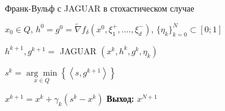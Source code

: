 \documentclass{beamer}
\begin{document}
\begin{frame}{Франк-Вульф с JAGUAR в стохастическом случае}
    
    \begin{algorithm}[H]
        \caption{ФВ с JAGUAR в стохастическом случае}
        \begin{algorithmic}[1]
                 $x_0 \in Q$, $h^0 = g^0 = \widetilde\nabla f_{\delta}(x^0, \xi_1^+, ...., \xi_d^-)$, $\{\eta_k\}_{k=0}^N \subset [0; 1]$
                
                    \State $h^{k+1}, g^{k+1} = $ JAGUAR $\left( x^k, h^k, g^k, \eta_k \right)$
                    
                    \State $s^k = \underset{x \in Q}{\arg\min}\left\{\left<s, g^{k+1} \right> \right\}$
                    
                    \State $x^{k+1} = x^k + \gamma_k (s^k - x^k)$ \label{line:x^k}
                \EndFor
            \State \textbf{Выход:} $x^{N+1}$ 
        	\end{algorithmic}
        \end{algorithm}
        
\end{frame}

\end{document}
